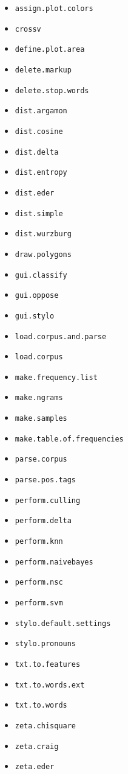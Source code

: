 \documentclass[11pt,a4paper]{article}
\def\code#1{{\tt #1}}
\begin{document}
\begin{itemize}
  \item \code{assign.plot.colors}
  \item \code{crossv} 
  \item \code{define.plot.area} 
  \item \code{delete.markup}
  \item \code{delete.stop.words}
  \item \code{dist.argamon}
  \item \code{dist.cosine}
  \item \code{dist.delta}
  \item \code{dist.entropy}
  \item \code{dist.eder}
  \item \code{dist.simple}
  \item \code{dist.wurzburg} 
  \item \code{draw.polygons}
  \item \code{gui.classify} 
  \item \code{gui.oppose}
  \item \code{gui.stylo} 
  \item \code{load.corpus.and.parse} 
  \item \code{load.corpus} 
  \item \code{make.frequency.list}
  \item \code{make.ngrams} 
  \item \code{make.samples} 
  \item \code{make.table.of.frequencies} 
  \item \code{parse.corpus}
  \item \code{parse.pos.tags}
  \item \code{perform.culling}  
  \item \code{perform.delta}
  \item \code{perform.knn}
  \item \code{perform.naivebayes}
  \item \code{perform.nsc}
  \item \code{perform.svm}
  \item \code{stylo.default.settings} 
  \item \code{stylo.pronouns} 
  \item \code{txt.to.features} 
  \item \code{txt.to.words.ext} 
  \item \code{txt.to.words} 
  \item \code{zeta.chisquare}
  \item \code{zeta.craig}
  \item \code{zeta.eder}
\end{itemize}
\end{document}
